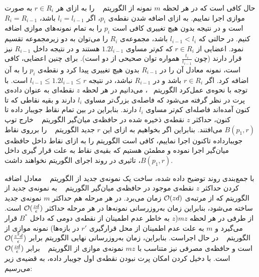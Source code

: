  حال کافی است که در هر لحظه $m$ نمونه از الگوریتم ~ را به ازای هر $r \in R_i$ به صورت موازی اجرا نماییم. به ازای اضافه شدن نقطه‌ی $p_i$، اگر $l_i = l_{i-1}$ باشد، $R_i = R_{i-1}$ است و در نتیجه بدون هیچ تغییری کافی است $p_i$ را به تمام نمونه‌های موازی اضافه کنیم. در حالتی که $l_{i-1} < l_{i}$ باشد، مجموعه‌ی $R_i$ را می‌توان به دو زیرمجموعه تقسیم نمود. اعضایی از $r \in R_i$ که کم‌تر مساوی $1.2l_{i-1}$ هستند و در نتیجه داخل $R_{i-1}$ نیز قرار دارند (چون $\frac{t_i}{t_{i-1}}$ همواره توان صحیحی از دو است). برای چنین اعضایی، کافی است، نمونه معادل‌ آن را در $R_{i-1}$ بدون هیچ تغییری پیدا کرد و نقطه‌ی $p_i$ را به آن اضافه کرد. اگر $r \in R_i$ باشد و در $R_{i-1}$ نباشد، در نتیجه $l_{i-1} \leq 1.2l_{i-1} \leq r$ است. با توجه با نحوه‌ی عمل‌کرد الگوریتم ~، می‌دانیم در هر لحظه $z$ نقطه‌ای به عنوان داده‌ی پرت در نظر گرفته می‌شود که فاصله‌ی بزرگ‌تر مساوی $l_i$ دارند و بقیه نقاطی که تا کنون آمده‌اند فاصله‌ای کم‌تر مساوی $l_i$ دارند. بنابراین در بین تمام نقاط جویبار داده تا کنون، حداکثر $z$ نقطه‌ی ذخیره شده در حافظه‌ی میان‌گیر الگوریتم ~ خارج توپ $B(p_1, r)$ می‌افتند. بنابراین اگر بخواهیم به ازای این $r$ جدید الگوریتم ~ را برروی نقاط جویبارداده تاکنون اجرا نماییم، کافی است الگوریتم را به ازای نقاط داخل حافظه‌ی میان‌گیر اجرا نموده و مطمئن هستیم که بقیه‌ی نقاط به علت قرار گیری داخل $B(p_1, r)$، تاثیری در روند اجرای الگوریتم نخواهند داشت. 
 
 با جمع‌بندی روند توضیح داده شده، ساخت یک نمونه‌ی جدید از الگوریتم ~ معادل اضافه کردن حداکثر $z$ نقطه‌ی موجود در حافظه‌ی میان‌گیر الگوریتم ~ به نمونه‌ی جدید از الگوریتم  که از مرتبه‌ی $\mathcal{O}(zd)$ زمان می‌برد. در هر مرحله هم حداکثر $m$ نمونه‌ی جدید ساخته می‌شود، بنابراین زمان به‌روزرسانی نمونه‌ها در هر مرحله حداکثر $\mathcal{O}(\frac{zd}{\epsilon})$ است. از طرفی در هر لحظه $mz$($z$ به خاطر عدم اطمینان از نقطه‌ی دومی که داخل $B^*$ قرار می‌گیرد و $m$ به علت عدم اطمینان از محل قرارگیری $r'$ در بازه‌ها) نمونه موازی از‌ الگوریتم ~ در حال اجراست. بنابراین، زمان به‌روزرسانی نهایی الگوریتم برابر $\mathcal{O}(\frac{z^2d}{\epsilon})$ است و حافظه‌ی مصرفی نیز متناسب با $mz$ نمونه‌ی موازی از الگوریتم ~ برابر $\mathcal{O}(\frac{zd}{\epsilon})$ است. با دخیل کردن امکان پرت نبودن نقطه‌ی اول جویبار داده، به قضیه‌ی زیر می‌رسیم:
 
